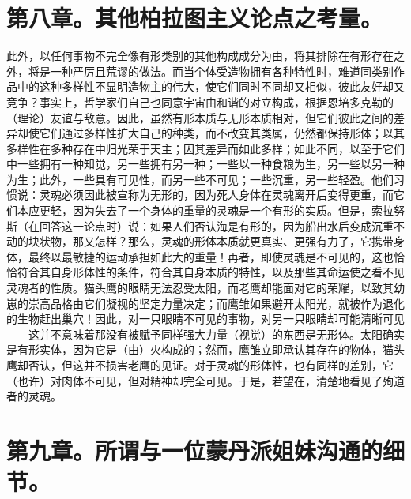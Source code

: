 
\section{第八章。其他柏拉图主义论点之考量。}

此外，以任何事物不完全像有形类别的其他构成成分为由，将其排除在有形存在之外，将是一种严厉且荒谬的做法。而当个体受造物拥有各种特性时，难道同类别作品中的这种多样性不显明造物主的伟大，使它们同时不同却又相似，彼此友好却又竞争？事实上，哲学家们自己也同意宇宙由和谐的对立构成，根据恩培多克勒的（理论）友谊与敌意。因此，虽然有形本质与无形本质相对，但它们彼此之间的差异却使它们通过多样性扩大自己的种类，而不改变其类属，仍然都保持形体；以其多样性在多种存在中归光荣于天主；因其差异而如此多样；如此不同，以至于它们中一些拥有一种知觉，另一些拥有另一种；一些以一种食粮为生，另一些以另一种为生；此外，一些具有可见性，而另一些不可见；一些沉重，另一些轻盈。他们习惯说：灵魂必须因此被宣称为无形的，因为死人身体在灵魂离开后变得更重，而它们本应更轻，因为失去了一个身体的重量的灵魂是一个有形的实质。但是，索拉努斯（在回答这一论点时）说：如果人们否认海是有形的，因为船出水后变成沉重不动的块状物，那又怎样？那么，灵魂的形体本质就更真实、更强有力了，它携带身体，最终以最敏捷的运动承担如此大的重量！再者，即使灵魂是不可见的，这也恰恰符合其自身形体性的条件，符合其自身本质的特性，以及那些其命运使之看不见灵魂者的性质。猫头鹰的眼睛无法忍受太阳，而老鹰却能面对它的荣耀，以致其幼崽的崇高品格由它们凝视的坚定力量决定；而鹰雏如果避开太阳光，就被作为退化的生物赶出巢穴！因此，对一只眼睛不可见的事物，对另一只眼睛却可能清晰可见——这并不意味着那没有被赋予同样强大力量（视觉）的东西是无形体。太阳确实是有形实体，因为它是（由）火构成的；然而，鹰雏立即承认其存在的物体，猫头鹰却否认，但这并不损害老鹰的见证。对于灵魂的形体性，也有同样的差别，它（也许）对肉体不可见，但对精神却完全可见。于是，若望在，清楚地看见了殉道者的灵魂。\par


\section{第九章。所谓与一位蒙丹派姐妹沟通的细节。}

